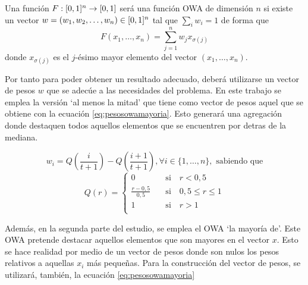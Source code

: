\documentclass[main]{subfiles}
\begin{document}
\begin{definition}\label{def:owa}
Una  función $F:[0,1]^n\rightarrow[0,1]$ será una función OWA de dimensión $n$ si existe un vector ${w=(w_{1},w_{2},\dots,w_{n})\in [0,1]^{n}}$ tal que ${\sum_{i}w_{i}=1}$ de forma que
$$F(x_{1},\dots,x_{n})=\sum^{n}_{j=1}w_{j}x_{\sigma(j)}$$
donde ${x_{\sigma(j)}}$ es el $j$-ésimo mayor elemento del vector ${(x_{1},\dots,x_{n})}$.
\end{definition}

Por tanto para poder obtener un resultado adecuado, deberá utilizarse un vector de pesos $w$ que se adecúe a las necesidades del problema. En este trabajo se emplea la versión `al menos la mitad' %
 que tiene como vector de pesos aquel que se obtiene con la ecuación \ref{eq:pesosowamayoria}. Esto generará una agregación donde destaquen todos aquellos elementos que se encuentren por detras de la mediana.

\begin{equation}\label{eq:pesosowamayoria}
	 w_i = Q\left(\frac{i}{t+1}\right) - Q\left(\frac{i+1}{t+1}\right), \forall i\in \{1, \dots, n\}, \text{   sabiendo que}
\end{equation}
	 $$Q(r) = \left\{\begin{aligned}
	 	0 					&\quad \text{si}\quad r<0,5\\
	 	\frac{r-0,5}{0,5}	&\quad \text{si}\quad 0,5\leq r\leq 1\\
	 	1 					&\quad \text{si}\quad r>1\\
	\end{aligned}\right.$$

Además, en la segunda parte del estudio, se emplea el OWA `la mayoría de'. Este OWA pretende destacar aquellos elementos que son mayores en el vector $x$. Esto se hace realidad por medio de un vector de pesos donde son nulos los pesos relativos a aquellas $x_i$ más pequeñas. Para la construcción del vector de pesos, se utilizará, también, la ecuación \ref{eq:pesosowamayoria}



\end{document}
